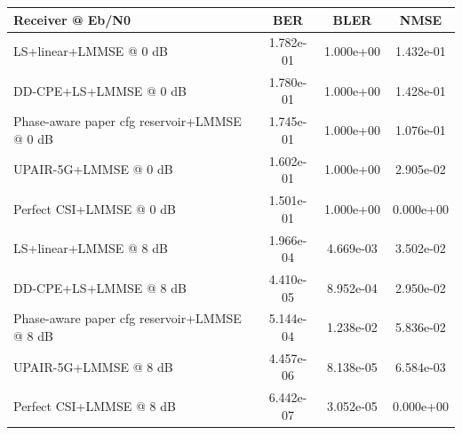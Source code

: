 \begin{tabular}{lccc}
\toprule
Receiver @ Eb/N0 & BER & BLER & NMSE \\
\midrule
LS+linear+LMMSE @ 0 dB & 1.782e-01 & 1.000e+00 & 1.432e-01 \\
DD-CPE+LS+LMMSE @ 0 dB & 1.780e-01 & 1.000e+00 & 1.428e-01 \\
Phase-aware paper cfg reservoir+LMMSE @ 0 dB & 1.745e-01 & 1.000e+00 & 1.076e-01 \\
UPAIR-5G+LMMSE @ 0 dB & 1.602e-01 & 1.000e+00 & 2.905e-02 \\
Perfect CSI+LMMSE @ 0 dB & 1.501e-01 & 1.000e+00 & 0.000e+00 \\
\midrule
LS+linear+LMMSE @ 8 dB & 1.966e-04 & 4.669e-03 & 3.502e-02 \\
DD-CPE+LS+LMMSE @ 8 dB & 4.410e-05 & 8.952e-04 & 2.950e-02 \\
Phase-aware paper cfg reservoir+LMMSE @ 8 dB & 5.144e-04 & 1.238e-02 & 5.836e-02 \\
UPAIR-5G+LMMSE @ 8 dB & 4.457e-06 & 8.138e-05 & 6.584e-03 \\
Perfect CSI+LMMSE @ 8 dB & 6.442e-07 & 3.052e-05 & 0.000e+00 \\
\bottomrule
\end{tabular}
